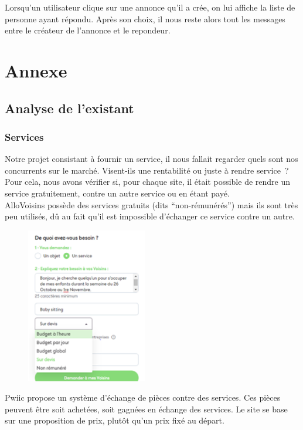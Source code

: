 \documentclass[a4paper,11pt]{article}
\begin{document}
Lorsqu'un utilisateur clique sur une annonce qu'il a crée, on lui affiche la liste de personne ayant répondu. Après son choix, il nous reste alors tout les messages entre le créateur de l'annonce et le repondeur.

\newpage
\section{Annexe}

\subsection{Analyse de l'existant}

\subsubsection{Services}

Notre projet consistant à fournir un service, il nous fallait regarder quels sont nos concurrents sur le marché.
Visent-ils une rentabilité ou juste à rendre service ? Pour cela, nous avons vérifier si, pour chaque site,
il était possible de rendre un service gratuitement, contre un autre service ou en étant payé.\\

AlloVoisins possède des services gratuits (dits “non-rémunérés”) mais ils sont très peu utilisés,
dû au fait qu’il est impossible d’échanger ce service contre un autre.\\

\begin{figure}[H]
  \includegraphics[width=200px]{images/services-allovoisins.png}
  \label{fig:services-allovoisins}
\end{figure}

Pwiic propose un système d’échange de pièces contre des services. Ces pièces peuvent être soit achetées,
soit gagnées en échange des services. Le site se base sur une proposition de prix, plutôt qu’un prix fixé au départ.\\
\end{document}
